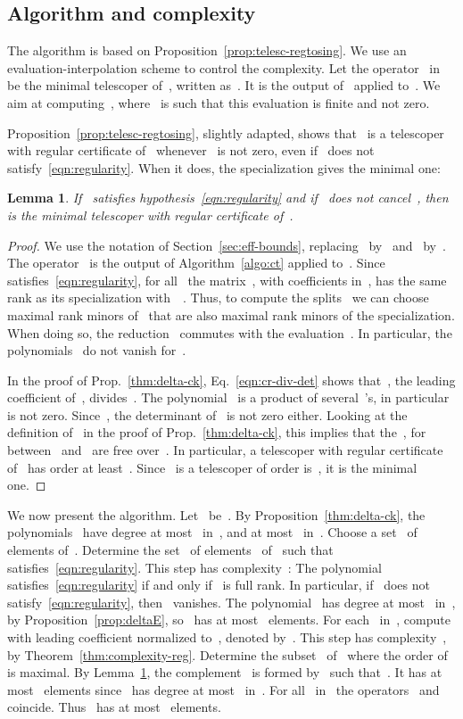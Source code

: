 \documentclass{sig-alternate}
\newtheorem{lem}[thm]{Lemma}
\begin{document}
\subsection{Algorithm and complexity}

\noindent The algorithm is based on Proposition~\ref{prop:telesc-regtosing}.
We use an evaluation-interpolation scheme to control the complexity.
Let the operator~ in~ be the minimal telescoper of~, written as~. It is the output of~ applied to~. We aim at computing~, where~ is such that this evaluation is finite and not zero.

Proposition~\ref{prop:telesc-regtosing}, slightly adapted, shows that~ is a telescoper with regular certificate of~ whenever~ is not zero, even if~ does not satisfy~\eqref{eqn:regularity}.
When it does, the specialization gives the minimal one:
\begin{lem}\label{lem:telesc-spe}
If~ satisfies hypothesis~\eqref{eqn:regularity}
and if~ does not cancel~,
then~ is the minimal telescoper with regular certificate of~.
\end{lem}

\begin{proof}
  We use  the notation of Section~\ref{sec:eff-bounds}, replacing~ by~ and~ by~.
  The operator~ is the output of Algorithm~\ref{algo:ct} applied to~.
  Since~ satisfies~\eqref{eqn:regularity}, for all~ the matrix~, with coefficients in~, has the same rank as its specialization with~~\cite[\S 58]{Mac16}.
  Thus, to compute the splits~ we can choose maximal rank minors of~ that are also maximal rank minors of the specialization.
  When doing so, the reduction~ commutes with the evaluation~.
  In particular, the polynomials~ do not vanish for~.

In the proof of Prop.~\ref{thm:delta-ck}, Eq.~\eqref{eqn:cr-div-det} shows that~, the leading coefficient of~, divides~. The polynomial~ is a product of several~'s, in particular~ is not zero.
  Since~, the determinant of~ is not zero either.
  Looking at the definition of~ in the proof of Prop.~\ref{thm:delta-ck}, this implies that the~, for~ between~ and~ are free over~.
In particular, a telescoper with regular certificate of~ has order at least~.
  Since~ is a telescoper of order is~, it is the minimal one.
\end{proof}


We now present the algorithm.
Let~ be~.
By Proposition~\ref{thm:delta-ck}, the polynomials~ have degree at most~ in~, and at most~ in~.
Choose a set~ of~ elements of~.
Determine the set~ of elements~ of~ such that~ satisfies~\eqref{eqn:regularity}.
This step has complexity~:
The polynomial~ satisfies~\eqref{eqn:regularity} if and only if~ is full rank.
In particular, if~ does not satisfy~\eqref{eqn:regularity}, then~ vanishes.
The polynomial~ has degree at most~ in~, by Proposition~\ref{prop:deltaE}, so~ has at most~ elements.
For each~ in~, compute~ with leading coefficient normalized to~, denoted by~.
This step has complexity~, by Theorem~\ref{thm:complexity-reg}.
Determine the subset~ of~ where the order of~ is maximal.
By Lemma~\ref{lem:telesc-spe}, the complement~ is formed by~ such that~.
It has at most~ elements since~ has degree at most~ in~.
For all~ in~ the operators~ and~ coincide.
Thus~ has at most~ elements.
\end{document}
